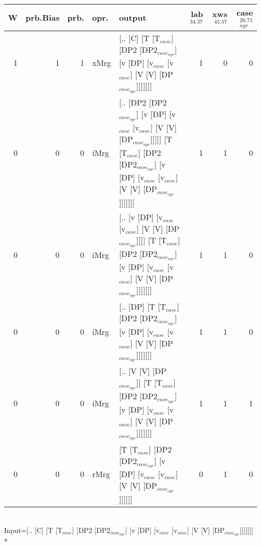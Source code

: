 \begin{tabularx}{\linewidth}{rrrlXrrr}
\hline
   W &   prb.Bias &   prb. & opr.   & output                                                                                                                                                        &   lab$^{34.37}$ &   xws$^{45.57}$ &   case$_{agr}^{26.71}$ \\
\hline
   1 &       1 &   1 & xMrg & [.. [C] [T [T$_{case}$] [DP2 [DP2$_{case_{agr}}$] [v [DP] [v$_{case}$ [v$_{case}$] [V [V] [DP$_{case_{agr}}$]]]]]]]                                                                   &             1 &             0 &                  0 \\
   0 &       0 &   0 & iMrg & [.. [DP2 [DP2$_{case_{agr}}$] [v [DP] [v$_{case}$ [v$_{case}$] [V [V] [DP$_{case_{agr}}$]]]]] [T [T$_{case}$] [DP2 [DP2$_{case_{agr}}$] [v [DP] [v$_{case}$ [v$_{case}$] [V [V] [DP$_{case_{agr}}$]]]]]]] &             1 &             1 &                  0 \\
   0 &       0 &   0 & iMrg & [.. [v [DP] [v$_{case}$ [v$_{case}$] [V [V] [DP$_{case_{agr}}$]]]] [T [T$_{case}$] [DP2 [DP2$_{case_{agr}}$] [v [DP] [v$_{case}$ [v$_{case}$] [V [V] [DP$_{case_{agr}}$]]]]]]]                      &             1 &             1 &                  0 \\
   0 &       0 &   0 & iMrg & [.. [DP] [T [T$_{case}$] [DP2 [DP2$_{case_{agr}}$] [v [DP] [v$_{case}$ [v$_{case}$] [V [V] [DP$_{case_{agr}}$]]]]]]]                                                                  &             1 &             1 &                  0 \\
   0 &       0 &   0 & iMrg & [.. [V [V] [DP$_{case_{agr}}$]] [T [T$_{case}$] [DP2 [DP2$_{case_{agr}}$] [v [DP] [v$_{case}$ [v$_{case}$] [V [V] [DP$_{case_{agr}}$]]]]]]]                                                 &             1 &             1 &                  1 \\
   0 &       0 &   0 & rMrg & [T [T$_{case}$] [DP2 [DP2$_{case_{agr}}$] [v [DP] [v$_{case}$ [v$_{case}$] [V [V] [DP$_{case_{agr}}$]]]]]]                                                                            &             0 &             1 &                  0 \\
\hline
\end{tabularx}\endgroup\\
\begingroup\scriptsize Input=[.. [C] [T [T$_{case}$] [DP2 [DP2$_{case_{agr}}$] [v [DP] [v$_{case}$ [v$_{case}$] [V [V] [DP$_{case_{agr}}$]]]]]]]\\*
